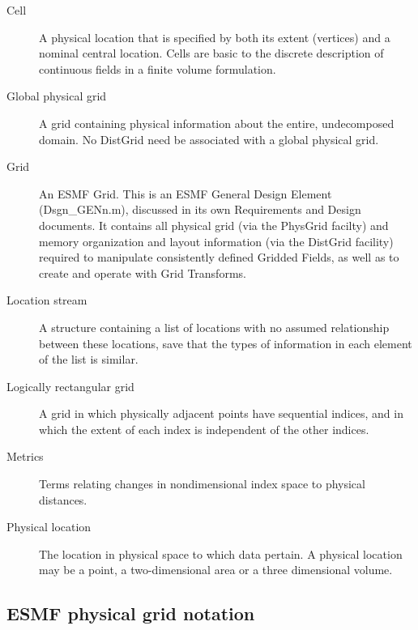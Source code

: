 
\begin{description}

\item [Cell] \label{glos:Cell} A physical location that is specified by both
its extent (vertices) and a nominal central location.  Cells are basic to the
discrete description of continuous fields in a finite volume formulation.

\item [Global physical grid] \label{glos:GlobGrid} A grid containing physical
information about the entire, undecomposed domain.  No DistGrid need be
associated with a global physical grid.

\item [Grid] An ESMF Grid. This is an ESMF General Design Element
(Dsgn\_GENn.m), discussed in its own Requirements and  Design documents. It
contains all physical grid (via the PhysGrid facilty) and memory organization
and layout information (via the DistGrid facility) required to manipulate
consistently defined Gridded Fields, as well as to create and operate with Grid
Transforms.

\item [Location stream] \label{glos:LocStream} A structure containing a list of
locations with no assumed relationship between these locations, save that the
types of information in each element of the list is similar.

\item [Logically rectangular grid] \label{glos:RecGrid} A grid in which
physically adjacent points have sequential indices, and in which the extent of
each index is independent of the other indices.

\item [Metrics] \label{glos:Metrics} Terms relating changes in nondimensional
index space to physical distances.

\item [Physical location] \label{glos:PhysLoc} The location in physical space 
to which data pertain.  A physical location may be a point, a two-dimensional 
area or a three dimensional volume.

\end{description}

\subsection{ESMF physical grid notation}

